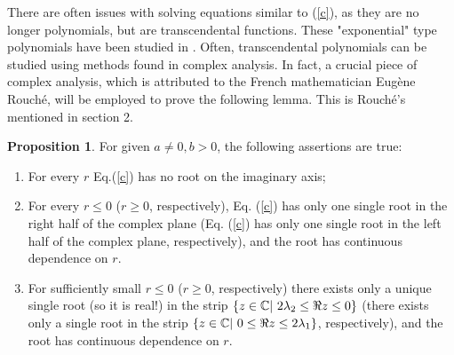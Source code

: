 \documentclass[12pt,letterpaper]{amsart}
\theoremstyle{definition}
\newtheorem{proposition}[theorem]{Proposition}
\theoremstyle{remark}
\numberwithin{equation}{section}
\begin{document}
There are often issues with solving equations similar to (\ref{c}), as they are no longer polynomials, but are transcendental functions. These "exponential" type polynomials have been studied in \cite{cookegrossman,hale,Wei1,Wei2}. Often, transcendental polynomials can be studied using methods found in complex analysis. 
In fact, a crucial piece of complex analysis, which is attributed to the French mathematician Eugène Rouché,  will be employed to prove the following lemma. This is Rouché's mentioned in section 2.  


\begin{proposition}\label{pro 1}
For given $a\not=0,b>0$, the following assertions are true:
\begin{enumerate}
\item For every $r$ Eq.(\ref{c}) has no root on the imaginary axis;
\item For every $r \le 0$ ($r\ge 0$, respectively), Eq. (\ref{c}) has only one single root in the right half of the complex plane (Eq. (\ref{c}) has only one single root in the left half of the complex plane, respectively), and the root has continuous dependence on $r$.
\item For sufficiently small $r\le 0$ ($r\ge 0$, respectively) there exists only a unique single root (so it is real!) in the strip $\{ z\in\mathbb C | \  2\lambda_2 \le \Re z \le 0\}$  (there exists only a single root in the strip $\{ z\in\mathbb C | \   0 \le \Re z \le 2\lambda_1\}$, respectively), and the root has continuous dependence on $r$.
\end{enumerate}
\end{proposition}
\end{document}
